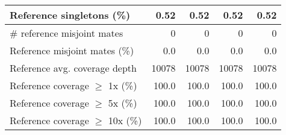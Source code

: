 \documentclass[12pt,a4paper]{article}
\begin{document}
\begin{table}[ht]
\begin{center}
\begin{tabular}{|l*{4}{|r}|}
Reference singletons (\%) & 0.52 & 0.52 & 0.52 & 0.52 \\ \hline
\# reference misjoint mates & 0 & 0 & 0 & 0 \\ \hline
Reference misjoint mates (\%) & 0.0 & 0.0 & 0.0 & 0.0 \\ \hline
Reference avg. coverage depth & 10078 & 10078 & 10078 & 10078 \\ \hline
Reference coverage $\geq$ 1x (\%) & 100.0 & 100.0 & 100.0 & 100.0 \\ \hline
Reference coverage $\geq$ 5x (\%) & 100.0 & 100.0 & 100.0 & 100.0 \\ \hline
Reference coverage $\geq$ 10x (\%) & 100.0 & 100.0 & 100.0 & 100.0 \\ \hline
\end{tabular}
\end{center}
\end{table}
\end{document}
